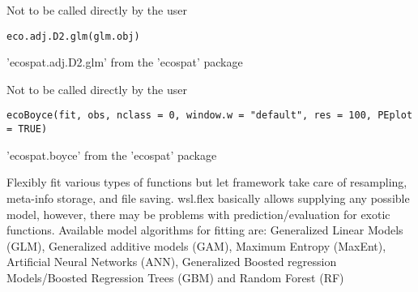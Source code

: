 \documentclass[a4paper]{book}
\begin{document}
%
\begin{Description}\relax
Not to be called directly by the user
\end{Description}
%
\begin{Usage}
\begin{verbatim}
eco.adj.D2.glm(glm.obj)
\end{verbatim}
\end{Usage}
%
\begin{Author}\relax
'ecospat.adj.D2.glm' from the 'ecospat' package
\end{Author}
%
\begin{Description}\relax
Not to be called directly by the user
\end{Description}
%
\begin{Usage}
\begin{verbatim}
ecoBoyce(fit, obs, nclass = 0, window.w = "default", res = 100, PEplot = TRUE)
\end{verbatim}
\end{Usage}
%
\begin{Author}\relax
'ecospat.boyce' from the 'ecospat' package
\end{Author}
%
\begin{Description}\relax
Flexibly fit various types of functions but let framework take care of resampling,
meta-info storage, and file saving. wsl.flex basically allows supplying any possible
model, however, there may be problems with prediction/evaluation for exotic functions.
Available model algorithms for fitting are: Generalized Linear Models (GLM), Generalized
additive models (GAM), Maximum Entropy (MaxEnt), Artificial Neural Networks (ANN),
Generalized Boosted regression Models/Boosted Regression Trees (GBM) and Random Forest (RF)
\end{Description}
%
\end{document}
